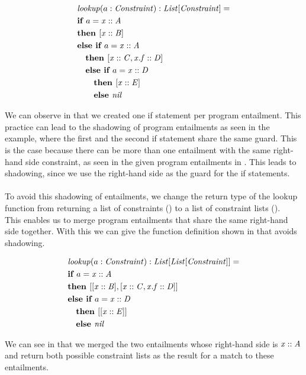 \begin{example}
\label{ex:lookup-fun-ite}
\begin{align*}
&\mathit{lookup}(a: \mathit{Constraint}): \mathit{List[\mathit{Constraint}]} = \\
&\textbf{if } a = \mathit{x} :: \mathit{A}\\
&\textbf{then } [\mathit{x} :: \mathit{B}]\\
&\textbf{else } \textbf{if } a = \mathit{x} :: \mathit{A}\\
&\quad \textbf{then } [\mathit{x} :: \mathit{C}, \mathit{x.f} :: \mathit{D}]\\
&\quad \textbf{else }\textbf{if } a = \mathit{x} :: \mathit{D}\\
&\qquad \textbf{then } [\mathit{x} :: \mathit{E}]\\
&\qquad \textbf{else } \mathit{nil}\\
\end{align*}
\end{example}
%
We can observe in  that we
created one if statement per program entailment.
This practice can lead to the shadowing of program entailments
as seen in the example, where the first and the second if statement share the same guard.
This is the case because there can be more than one entailment
with the same right-hand side constraint,
as seen in the given program entailments in .
This leads to shadowing, since we use the
right-hand side as the guard for the if statements.\\
\\
To avoid this shadowing of entailments,
we change the return type of the lookup function
from returning a list of constraints (\Constrs)
to a list of constraint lists (\Constrss).\\
This enables us to merge program entailments that
share the same right-hand side together.
With this we can give the function definition shown in
 that avoids shadowing.
%
\begin{example}
\label{ex:lookup-fun-shadowing}
\begin{align*}
&\mathit{lookup}(a: \mathit{Constraint}): \mathit{List[\mathit{List[\mathit{Constraint}]}]} = \\
&\textbf{if } a = \mathit{x} :: \mathit{A}\\
&\textbf{then } [[\mathit{x} :: \mathit{B}], [\mathit{x} :: \mathit{C}, \mathit{x.f} :: \mathit{D}]]\\
&\textbf{else } \textbf{if } a = \mathit{x} :: \mathit{D}\\
&\quad\textbf{then } [[\mathit{x} :: \mathit{E}]]\\
&\quad\textbf{else } \mathit{nil}\\
\end{align*}
\end{example}
%
We can see in 
that we merged the two entailments whose right-hand side
is $\mathit{x} :: \mathit{A}$ and return both possible constraint lists
as the result for a match to these entailments.

